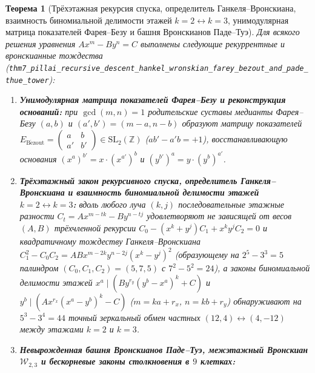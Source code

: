 \documentclass[11pt,a4paper]{article}
\theoremstyle{plain}
\newtheorem{theorem}{Теорема}[section]
\theoremstyle{definition}
\begin{document}
\begin{theorem}[Трёхэтажная рекурсия спуска, определитель Ганкеля--Вронскиана, взаимность биномиальной делимости этажей $k=2\leftrightarrow k=3$, унимодулярная матрица показателей Фарея--Безу и башня Вронскианов Паде--Туэ]
\label{thm:main-7}
Для всякого решения уравнения $A x^m - B y^n = C$ выполнены следующие рекуррентные и вронскианные тождества (\texttt{thm7\_pillai\_recursive\_descent\_hankel\_wronskian\_farey\_bezout\_and\_pade\_thue\_tower}):
\begin{enumerate}[label=\textbf{(\roman*)},leftmargin=*]
\item \textbf{Унимодулярная матрица показателей Фарея--Безу и реконструкция оснований:}
  при $\gcd(m,n)=1$ родительские суставы медианты Фарея--Безу $(a,b)$ и $(a',b') = (m-a,n-b)$ образуют матрицу показателей $E_{\mathrm{B\acute{e}zout}} = \begin{pmatrix} a & b \\ a' & b' \end{pmatrix}\in\mathrm{SL}_2(\mathbb{Z})$ ($a b' - a' b = +1$), восстанавливающую основания $(x^a)^{b'} = x\cdot (x^{a'})^b$ и $(y^{b'})^a = y\cdot (y^b)^{a'}$.
\item \textbf{Трёхэтажный закон рекурсивного спуска, определитель Ганкеля--Вронскиана и взаимность биномиальной делимости этажей $k=2 \leftrightarrow k=3$:}
  вдоль любого луча $(k,j)$ последовательные этажные разности $C_t = A x^{m-tk} - B y^{n-tj}$ удовлетворяют не зависящей от весов $(A,B)$ трёхчленной рекурсии $C_0 - (x^k+y^j)C_1 + x^k y^j C_2 = 0$ и квадратичному тождеству Ганкеля--Вронскиана $C_1^2 - C_0 C_2 = A B x^{m-2k}y^{n-2j}(x^k-y^j)^2$ (образующему на $2^5 - 3^3 = 5$ палиндром $(C_0,C_1,C_2) = (5,7,5)$ с $7^2 - 5^2 = 24$), а законы биномиальной делимости этажей $x^a \mid (B y^{r_y}(y^b-x^a)^k + C)$ и $y^b \mid (A x^{r_x}(x^a-y^b)^k - C)$ ($m = ka+r_x$, $n = kb+r_y$) обнаруживают на $5^3 - 3^4 = 44$ точный зеркальный обмен частных $(12, 4) \leftrightarrow (4, -12)$ между этажами $k=2$ и $k=3$.
\item \textbf{Невырожденная башня Вронскианов Паде--Туэ, межэтажный Вронскиан $\mathcal{W}_{2,3}$ и бескорневые законы столкновения в $9$ клетках:}

\end{enumerate}
\end{theorem}
\end{document}
